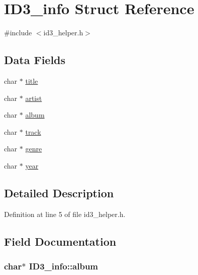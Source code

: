 \hypertarget{structID3__info}{\section{I\-D3\-\_\-info Struct Reference}
\label{structID3__info}
}


{\ttfamily \#include $<$id3\-\_\-helper.\-h$>$}

\subsection*{Data Fields}
\begin{DoxyCompactItemize}
\item 
char $\ast$ \hyperlink{structID3__info_a29629369a9d66ed46a6b89d57d6eb87b}{title}
\item 
char $\ast$ \hyperlink{structID3__info_a2436410e971cad163dd2b21b6854f7db}{artist}
\item 
char $\ast$ \hyperlink{structID3__info_a55dc7d850ff23a5c3f63a245530055a5}{album}
\item 
char $\ast$ \hyperlink{structID3__info_a7cb186120387859b4ea37b7c6f4498c8}{track}
\item 
char $\ast$ \hyperlink{structID3__info_a526e7609a22a4648bd26b47125b45a91}{genre}
\item 
char $\ast$ \hyperlink{structID3__info_a825ffa413987b719f9dfa06fc8e9cc23}{year}
\end{DoxyCompactItemize}


\subsection{Detailed Description}


Definition at line 5 of file id3\-\_\-helper.\-h.



\subsection{Field Documentation}
\hypertarget{structID3__info_a55dc7d850ff23a5c3f63a245530055a5}{
\subsubsection[{album}]{\setlength{\rightskip}{0pt plus 5cm}char$\ast$ I\-D3\-\_\-info\-::album}}\label{structID3__info_a55dc7d850ff23a5c3f63a245530055a5}



